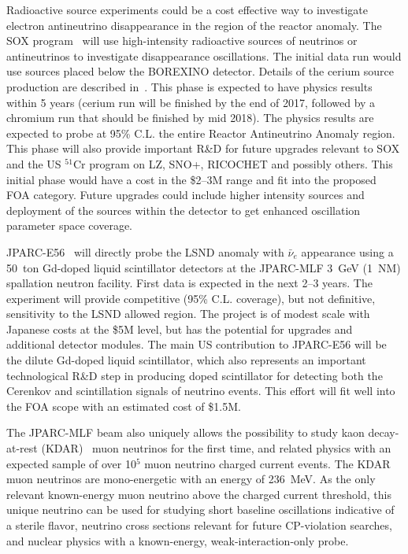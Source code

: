 \noindent Radioactive source experiments could be a cost effective way
to investigate electron antineutrino disappearance in the region of
the reactor anomaly. The SOX program~\cite{bib:SOX} will use
high-intensity radioactive sources of neutrinos or antineutrinos to
investigate disappearance oscillations. The initial data run would
use sources placed below the BOREXINO detector. Details of the cerium
source production are described in~\cite{bib:CL}. This phase is
expected to have physics results within 5 years (cerium run will be
finished by the end of 2017, followed by a chromium run that should be
finished by mid 2018). The physics results are expected to probe at
95\% C.L. the entire Reactor Antineutrino Anomaly region. This phase
will also provide important R\&D for future upgrades relevant to SOX
and the US $^{51}$Cr program on LZ, SNO+, RICOCHET and possibly
others. This initial phase would have a cost in
the \$2--3M range and fit into the proposed FOA category.
Future upgrades could include higher intensity sources and deployment
of the sources within the detector to get enhanced oscillation
parameter space coverage.


\noindent JPARC-E56~\cite{JPARC_P_56} will directly probe the LSND
anomaly with $\bar\nu_e$ appearance using a 50~ton Gd-doped liquid
scintillator detectors at the JPARC-MLF 3~GeV (1~NM) spallation
neutron facility. First data is expected in the next 2--3 years. The
experiment will provide competitive (95\% C.L. coverage), but not
definitive, sensitivity to the LSND allowed region. The project is of
modest scale with Japanese costs at the \$5M level, but has the
potential for upgrades and additional detector modules. The main US
contribution to JPARC-E56 will be the dilute Gd-doped liquid
scintillator, which also represents an important technological R\&D
step in producing doped scintillator for detecting both the Cerenkov
and scintillation signals of neutrino events. This effort will fit
well into the FOA scope with an estimated cost of \$1.5M.


The JPARC-MLF beam also uniquely allows the possibility to study kaon
decay-at-rest (KDAR)~\cite{KDAR,KDAR1} muon neutrinos for the first time,
and related physics with an expected sample of over 10$^5$ muon
neutrino charged current events. The KDAR muon neutrinos are
mono-energetic with an energy of 236~MeV. As the only relevant
known-energy muon neutrino above the charged current threshold, this
unique neutrino can be used for studying short baseline oscillations
indicative of a sterile flavor, neutrino cross sections relevant for
future CP-violation searches, and nuclear physics with a known-energy,
weak-interaction-only probe.

